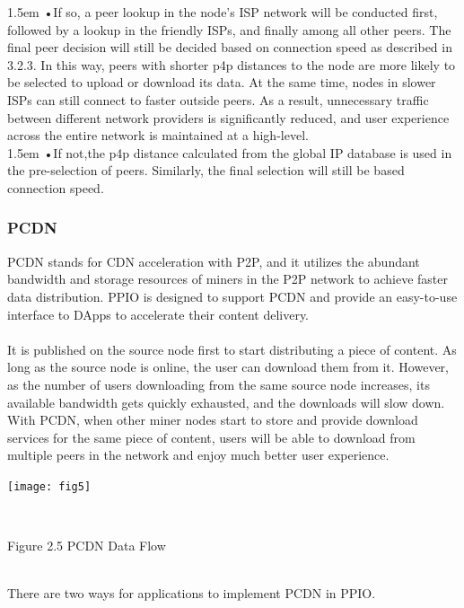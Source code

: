 \documentclass[10pt,a4paper]{article}
\begin{document}
\hangindent 1.5em
\noindent   
•\quad If so, a peer lookup in the node’s ISP network will be conducted first, followed by a lookup in the friendly ISPs, and finally among all other peers. The final peer decision will still be decided based on connection speed as described in 3.2.3. In this way, peers with shorter p4p distances to the node are more likely to be selected to upload or download its data. At the same time, nodes in slower ISPs can still connect to faster outside peers. As a result, unnecessary traffic between different network providers is significantly reduced, and user experience across the entire network is maintained at a high-level.
\vspace{-0.8em}
\\

\hangindent 1.5em
\noindent   
•\quad  If not,the p4p distance calculated from the global IP database is used in the pre-selection of peers. Similarly, the final selection will still be based connection speed.
\vspace{-0.8em}

 
         \subsubsection{PCDN}  %
PCDN stands for CDN acceleration with P2P, and it utilizes the abundant bandwidth and storage resources of miners in the P2P network to achieve faster data distribution. PPIO is designed to support PCDN and provide an easy-to-use interface to DApps to accelerate their content delivery. 
\vspace{-0.5em}
\\ \\It is published on the source node first to start distributing a piece of content. As long as the source node is online, the user can download them from it. However, as the number of users downloading from the same source node increases, its available bandwidth gets quickly exhausted, and the downloads will slow down. With PCDN, when other miner nodes start to store and provide download services for the same piece of content, users will be able to download from multiple peers in the network and enjoy much better user experience.\\
\centerline{\texttt{[image: fig5]}}
\vspace{-0.5em}
 \\ \centerline{{Figure 2.5 PCDN Data Flow}}
\vspace{-0.5em}
 \\ There are two ways for applications to implement PCDN in PPIO.
\vspace{-0.7em}
\\
\end{document}
